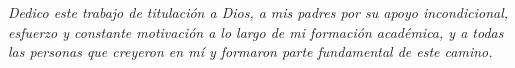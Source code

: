 

\hfill
\begin{minipage}{0.48\textwidth}
    \fontsize{10}{13}\selectfont
    \itshape
    Dedico este trabajo de titulación a Dios, a mis padres por su apoyo incondicional, esfuerzo y constante motivación a lo largo de mi formación académica, y a todas las personas que creyeron en mí y formaron parte fundamental de este camino.
\end{minipage}
